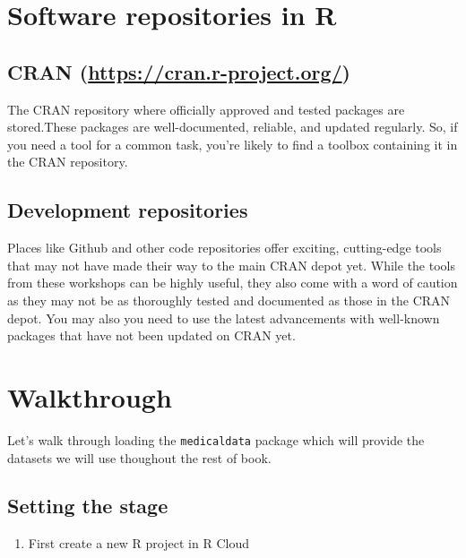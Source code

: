 \documentclass[
  letterpaper,
  DIV=11,
  numbers=noendperiod]{scrreprt}
\providecommand{\tightlist}{%
  \setlength{\itemsep}{0pt}\setlength{\parskip}{0pt}}\usepackage{longtable,booktabs,array}
\begin{document}
\hypertarget{software-repositories-in-r}{%
\section{Software repositories in R}\label{software-repositories-in-r}}

\hypertarget{cran-httpscran.r-project.org}{%
\subsection{\texorpdfstring{CRAN
(\url{https://cran.r-project.org/})}{CRAN (https://cran.r-project.org/)}}\label{cran-httpscran.r-project.org}}

The CRAN repository where officially approved and tested packages are
stored.These packages are well-documented, reliable, and updated
regularly. So, if you need a tool for a common task, you're likely to
find a toolbox containing it in the CRAN repository.

\hypertarget{development-repositories}{%
\subsection{Development repositories}\label{development-repositories}}

Places like Github and other code repositories offer exciting,
cutting-edge tools that may not have made their way to the main CRAN
depot yet. While the tools from these workshops can be highly useful,
they also come with a word of caution as they may not be as thoroughly
tested and documented as those in the CRAN depot. You may also you need
to use the latest advancements with well-known packages that have not
been updated on CRAN yet.

\hypertarget{walkthrough}{%
\section{Walkthrough}\label{walkthrough}}

Let's walk through loading the \texttt{medicaldata} package which will
provide the datasets we will use thoughout the rest of book.

\hypertarget{setting-the-stage}{%
\subsection{Setting the stage}\label{setting-the-stage}}

\begin{enumerate}
\def\labelenumi{\arabic{enumi}.}
\tightlist
\item
  First create a new R project in R Cloud
\end{enumerate}
\end{document}
